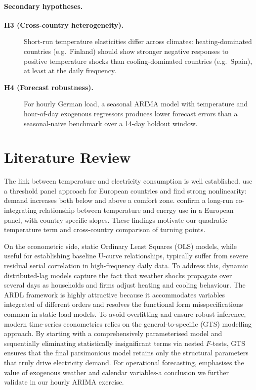 \documentclass[12pt,a4paper]{article}
\begin{document}
\paragraph{Secondary hypotheses.}
\begin{description}
  \item[\textbf{H3 (Cross-country heterogeneity).}] Short-run temperature elasticities differ across climates: heating-dominated countries (e.g.\ Finland) should show stronger negative responses to positive temperature shocks than cooling-dominated countries (e.g.\ Spain), at least at the daily frequency.
  \item[\textbf{H4 (Forecast robustness).}] For hourly German load, a seasonal ARIMA model with temperature and hour-of-day exogenous regressors produces lower forecast errors than a seasonal-naive benchmark over a 14-day holdout window.
\end{description}

\section{Literature Review}
\label{sec:litreview}

The link between temperature and electricity consumption is well established. \citet{bessec2008} use a threshold panel approach for European countries and find strong nonlinearity: demand increases both below and above a comfort zone. \citet{apadula2012} confirm a long-run co-integrating relationship between temperature and energy use in a European panel, with country-specific slopes. These findings motivate our quadratic temperature term and cross-country comparison of turning points.

\noindent On the econometric side, static Ordinary Least Squares (OLS) models, while useful for establishing baseline U-curve relationships, typically suffer from severe residual serial correlation in high-frequency daily data. To address this, dynamic distributed-lag models capture the fact that weather shocks propagate over several days as households and firms adjust heating and cooling behaviour. The ARDL framework \citep{pesaran1997} is highly attractive because it accommodates variables integrated of different orders and resolves the functional form misspecifications common in static load models.   To avoid overfitting and ensure robust inference, modern time-series econometrics relies on the general-to-specific (GTS) modelling approach. By starting with a comprehensively parameterised model and sequentially eliminating statistically insignificant terms via nested $F$-tests, GTS ensures that the final parsimonious model retains only the structural parameters that truly drive electricity demand. For operational forecasting, \citet{weron2014} emphasises the value of exogenous weather and calendar variables-a conclusion we further validate in our hourly ARIMA exercise.
\end{document}

